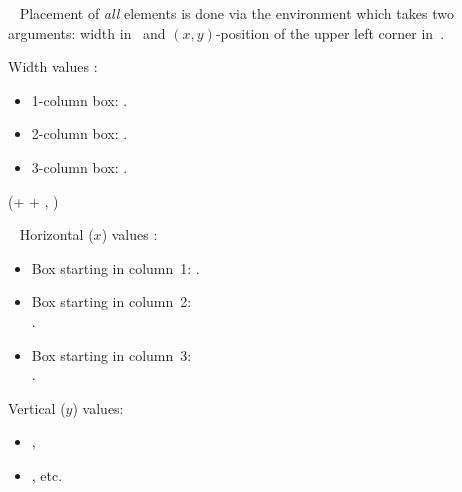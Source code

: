 \documentclass{beamer}
\newlength{\blockOne}
\newlength{\blockTwo}
\newlength{\blockFour}
\begin{document}
\begin{frame}[t]
\begin{textblock*}{\colwidth}
\begin{parblock}{~}
	\noindent Placement of \emph{all} elements is done via the  environment which takes two arguments: width in~\code{\{\}} and $(x, y)$-position of the upper left corner in~\code{()}.

	\vspace{0.666667\baselineskip}\noindent%
	\alert{Width values} :
	\begin{itemize}
		\setlength{\itemsep}{0pt}
		\item 1-column box: .
		\item 2-column box: .
		\item 3-column box: .
	\end{itemize}

\end{parblock}

\end{textblock*}




\begin{textblock*}{\colwidth}(\leftmargin + \colwidth + \colsep, \blockFour)

\begin{parblock}{~}
	\alert{Horizontal ($x$) values} :
	\begin{itemize}
		\setlength{\itemsep}{0pt}
		\item Box starting in column~1: .
		\item Box starting in column~2: \\
			.
		\item Box starting in column~3: \\
			.
	\end{itemize}

	\vspace{0.333333\baselineskip}\noindent%
	\alert{Vertical ($y$) values:}
	\begin{itemize}
		\setlength{\itemsep}{0pt}
		\item {},
		\item {}, etc.
	\end{itemize}
\end{parblock}


\end{textblock*}
\end{frame}
\end{document}
